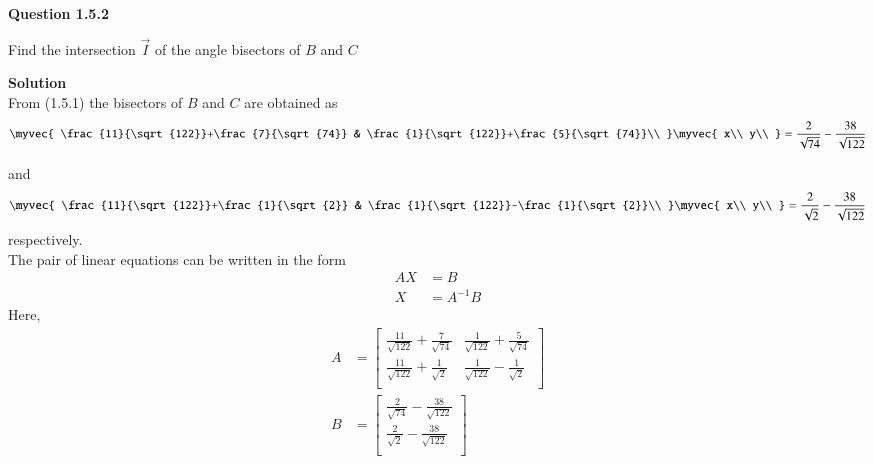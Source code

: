 \documentclass[journal,12pt,twocolumn]{IEEEtran}
\begin{document}



\vspace{3cm}

\textbf{Question 1.5.2}
\begin{flushleft}
Find the intersection $\vec{I}$ of the angle bisectors of $B$ and $C$
\end{flushleft}

\begin{flushleft}
\textbf{Solution}\\
From (1.5.1) the bisectors of $B$ and $C$ are obtained as 
\begin{align}
\myvec{
\frac{11}{\sqrt{122}}+\frac{7}{\sqrt{74}} & \frac{1}{\sqrt{122}}+\frac{5}{\sqrt{74}}\\
}
\myvec{
x\\
y\\
}
=\frac{2}{\sqrt{74}}-\frac{38}{\sqrt{122}}
\end{align}

and 
\begin{align}
\myvec{
\frac{11}{\sqrt{122}}+\frac{1}{\sqrt{2}} & \frac{1}{\sqrt{122}}-\frac{1}{\sqrt{2}}\\
}
\myvec{
x\\
y\\
}
=\frac{2}{\sqrt{2}}-\frac{38}{\sqrt{122}}
\end{align}
respectively.\\
The pair of linear equations can be written in the form 
\begin{align}
AX &=B\\
X&=A^{-1}B
\end{align}
Here,
\begin{align}
A&=\begin{bmatrix}
\frac{11}{\sqrt{122}}+\frac{7}{\sqrt{74}} & \frac{1}{\sqrt{122}}+\frac{5}{\sqrt{74}}\\
\frac{11}{\sqrt{122}}+\frac{1}{\sqrt{2}} & \frac{1}{\sqrt{122}}-\frac{1}{\sqrt{2}}\\
\end{bmatrix}\\
B&=\begin{bmatrix}
\frac{2}{\sqrt{74}}-\frac{38}{\sqrt{122}}\\
\frac{2}{\sqrt{2}}-\frac{38}{\sqrt{122}}\\
\end{bmatrix}
\end{align}


\end{flushleft}
\end{document}
